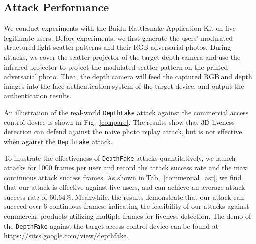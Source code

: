 
\subsection{Attack Performance}
We conduct experiments with the Baidu Rattlesnake Application Kit on five legitimate users.
Before experiments, we first generate the users' modulated structured light scatter patterns and their RGB adversarial photos.
During attacks, we cover the scatter projector of the target depth camera and use the infrared projector to project the modulated scatter pattern on the printed adversarial photo. Then, the depth camera will feed the captured RGB and depth images into the face authentication system of the target device, and output the authentication results.

An illustration of the real-world \texttt{DepthFake} attack against the commercial access control device is shown in Fig.~\ref{compare}. The results show that 3D liveness detection can defend against the naive photo replay attack, but is not effective when against the \texttt{DepthFake} attack. 

To illustrate the effectiveness of \texttt{DepthFake} attacks quantitatively, we launch attacks for 1000 frames per user and record the attack success rate and the max continuous attack success frames.
As shown in Tab.~\ref{commercial_asr}, we find that our attack is effective against five users, and can achieve an average attack success rate of $60.64\%$. 
Meanwhile, the results demonstrate that our attack can succeed over 6 continuous frames, indicating the feasibility of our attacks against commercial products utilizing multiple frames for liveness detection.  The demo of the \texttt{DepthFake} against the target access control device can be found at https://sites.google.com/view/depthfake.

